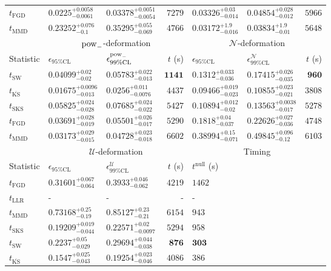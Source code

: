 \begin{tabular}{l|llr|llr}
	$t_{\mathrm{FGD}}$ & ${\mathbf{0.0225_{-0.0061}^{+0.0058}}}$ & ${\mathbf{0.03378_{-0.0054}^{+0.0051}}}$ & $7279$ & $0.03326_{-0.014}^{+0.03}$ & $0.04854_{-0.012}^{+0.028}$ & $5966$ \\
	$t_{\mathrm{MMD}}$ & $0.23252_{-0.1}^{+0.076}$ & $0.35295_{-0.069}^{+0.055}$ & $4766$ & $0.03172_{-0.016}^{+1.9}$ & $0.03834_{-0.01}^{+1.9}$ & $5648$ \\
	\toprule
	\multicolumn{1}{c}{} & \multicolumn{3}{c}{$\rm{pow}_{-}$-deformation} & \multicolumn{3}{c}{$\mathcal{N}$-deformation} \\
	Statistic & $\epsilon_{95\%\mathrm{CL}}$ & $\epsilon^  {\rm{pow}_{-}}_{99\%\mathrm{CL}}$ & $t$ (s) & $\epsilon_{95\%\mathrm{CL}}$ & $\epsilon^    {\mathcal{N}}_{99\%\mathrm{CL}}$ & $t$ (s) \\
	\midrule
	$t_{\mathrm{SW}}$ & $0.04099_{-0.02}^{+0.02}$ & $0.05783_{-0.013}^{+0.022}$ & ${\mathbf{1141}}$ & $0.1312_{-0.036}^{+0.033}$ & $0.17415_{-0.035}^{+0.026}$ & ${\mathbf{960}}$ \\
	$t_{\overline{\mathrm{KS}}}$ & ${\mathbf{0.01675_{-0.013}^{+0.0096}}}$ & ${\mathbf{0.0256_{-0.0076}^{+0.011}}}$ & $4437$ & ${\mathbf{0.09466_{-0.023}^{+0.019}}}$ & ${\mathbf{0.10855_{-0.021}^{+0.023}}}$ & $3808$ \\
	$t_{\mathrm{SKS}}$ & $0.05825_{-0.028}^{+0.024}$ & $0.07685_{-0.022}^{+0.024}$ & $5427$ & $0.10894_{-0.02}^{+0.012}$ & $0.13563_{-0.017}^{+0.0038}$ & $5278$ \\
	$t_{\mathrm{FGD}}$ & $0.03691_{-0.019}^{+0.028}$ & $0.05501_{-0.017}^{+0.026}$ & $5290$ & $0.1818_{-0.037}^{+0.04}$ & $0.22626_{-0.036}^{+0.027}$ & $4748$ \\
	$t_{\mathrm{MMD}}$ & $0.03173_{-0.015}^{+0.029}$ & $0.04728_{-0.018}^{+0.023}$ & $6602$ & $0.38994_{-0.071}^{+0.15}$ & $0.49845_{-0.12}^{+0.096}$ & $6103$ \\
	\toprule
	\multicolumn{1}{c}{} & \multicolumn{3}{c}{$\mathcal{U}$-deformation} & \multicolumn{3}{c}{Timing} \\
	Statistic & $\epsilon_{95\%\mathrm{CL}}$ & $\epsilon^    {\mathcal{U}}_{99\%\mathrm{CL}}$ & $t$ (s) & $t^{\mathrm{null}}$ (s) \\
	\midrule
	$t_{\mathrm{FGD}}$ & $0.31601_{-0.064}^{+0.067}$ & $0.3933_{-0.062}^{+0.046}$ & $4219$ & $1462$ \\
	$t_{\mathrm{LLR}}$ & - & - & - & - \\
	$t_{\mathrm{MMD}}$ & $0.73168_{-0.19}^{+0.25}$ & $0.85127_{-0.21}^{+0.23}$ & $6154$ & $943$ \\
	$t_{\mathrm{SKS}}$ & $0.19209_{-0.044}^{+0.019}$ & $0.22571_{-0.0097}^{+0.02}$ & $5294$ & $958$ \\
	$t_{\mathrm{SW}}$ & $0.2237_{-0.029}^{+0.05}$ & $0.29694_{-0.038}^{+0.044}$ & ${\mathbf{876}}$ & ${\mathbf{303}}$ \\
	$t_{\overline{\mathrm{KS}}}$ & ${\mathbf{0.1547_{-0.043}^{+0.025}}}$ & ${\mathbf{0.19254_{-0.046}^{+0.023}}}$ & $4086$ & $386$ \\
	\bottomrule
\end{tabular}